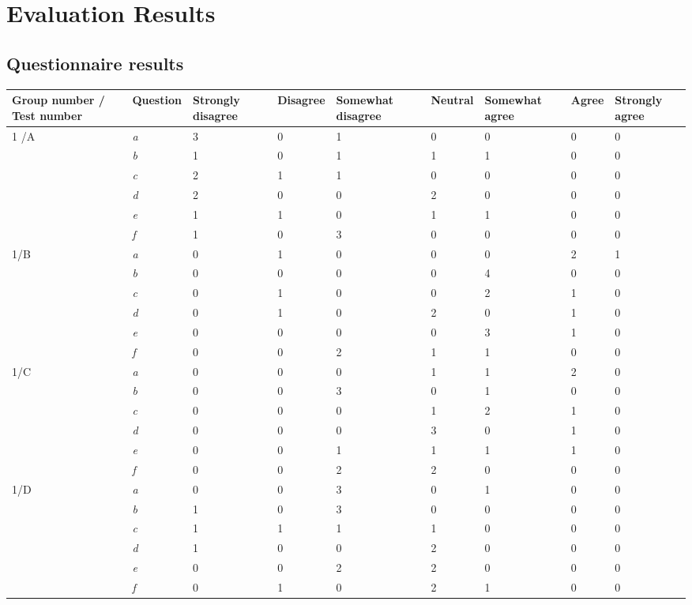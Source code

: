 \chapter{Evaluation Results}\label{ch:EvalResults}
\section{Questionnaire results}
\begin{center}\small \label{Test1}
	\begin{tabular}{ p{1.4cm} | p{1.4cm} | p{1.3cm} | p{1.4cm} | p{1.7cm} | p{1.2cm} | p{1.7cm} | p{0.9cm}| p{1.3cm} |}
\hline
\textbf{Group number / Test 	number} &\textbf{Question}	&	\textbf{Strongly disagree}	&	\textbf{Disagree}	&	\textbf{Somewhat disagree}	&	\textbf{Neutral}	&	\textbf{Somewhat agree}	&	\textbf{Agree}	&	\textbf{Strongly agree} \\ \hline
1 /A	& 	\textit{a}	&	3	&	0	&	1	&	0	&	0	&	0	&	0 \\ \hline
		&	\textit{b}	&	1	&	0	&	1	&	1	&	1	&	0	&	0 \\ \hline
		&	\textit{c}	&	2	&	1	&	1	&	0	&	0	&	0	&	0	\\ \hline
		&	\textit{d}	&	2	&	0	&	0	&	2	&	0	&	0	&	0 \\ \hline
		&	\textit{e}	&	1	&	1	&	0	&	1	&	1	&	0	&	0 \\ \hline
		&	\textit{f}	&	1	&	0	&	3	&	0	&	0	&	0	&	0	\\ \hline
1/B		&	\textit{a}	&	0	&	1	&	0	&	0	&	0	&	2	&	1 	\\ \hline
		&	\textit{b}	&	0	&	0	&	0	&	0	&	4	&	0	&	0	\\ \hline
		&	\textit{c}	&	0	&	1	&	0	&	0	&	2	&	1	&	0	\\ \hline
		&	\textit{d}	&	0	&	1	&	0	&	2	&	0	&	1	&	0	\\ \hline
		&	\textit{e}	&	0	&	0	&	0	&	0	&	3	&	1	&	0	\\ \hline
		&	\textit{f}	&	0	&	0	&	2	&	1	&	1	&	0	&	0	\\ \hline
1/C		&	\textit{a}	&	0	&	0	&	0	&	1	&	1	&	2	&	0	\\ \hline
		&	\textit{b}	&	0	&	0	&	3	&	0	&	1	&	0	&	0	\\ \hline
		&	\textit{c}	&	0	&	0	&	0	&	1	&	2	&	1	&	0	\\ \hline
		&	\textit{d}	&	0	&	0	&	0	&	3	&	0	&	1	&	0	\\ \hline
		&	\textit{e}	&	0	&	0	&	1	&	1	&	1	&	1	&	0	\\ \hline
		&	\textit{f}	&	0	&	0	&	2	&	2	&	0	&	0	&	0	\\ \hline
1/D		&	\textit{a}	&	0	&	0	&	3	&	0	&	1	&	0	&	0	\\ \hline
		&	\textit{b}	&	1	&	0	&	3	&	0	&	0	&	0	&	0	\\ \hline
		&	\textit{c}	&	1	&	1	&	1	&	1	&	0	&	0	&	0	\\ \hline
		&	\textit{d}	&	1	&	0	&	0	&	2	&	0	&	0	&	0	\\ \hline
		&	\textit{e}	&	0	&	0	&	2	&	2	&	0	&	0	&	0	\\ \hline
		&	\textit{f}	&	0	&	1	&	0	&	2	&	1	&	0	&	0	\\ \hline
		
	\end{tabular}
\end{center}
